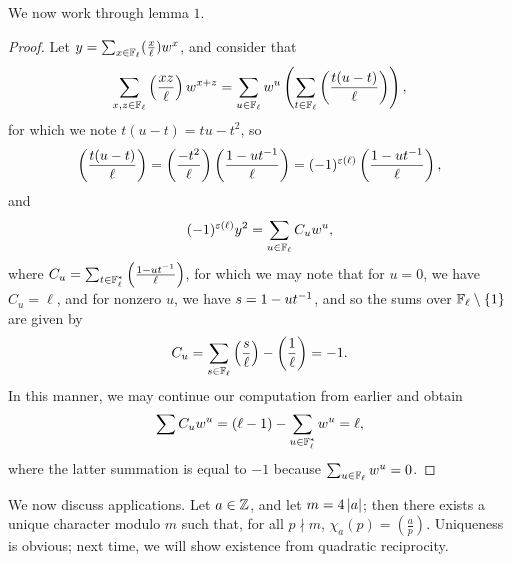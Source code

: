 We now work through lemma $1$.
\begin{proof}
    Let $y = \sum_{x \in \mathbb F_\ell} (\frac{x}{\ell}) w^x$, and consider that
    \[ \sum_{x, z \in \mathbb F_\ell} \left(\frac{xz}{\ell}\right) w^{x + z} = \sum_{u \in \mathbb F_\ell} w^u \left(\sum_{t \in \mathbb F_\ell} \left(\frac{t(u-t)}{\ell}\right)\right), \]
    for which we note $t(u - t) = tu - t^2$, so
    \[ \left(\frac{t(u-t)}{\ell}\right) = \left(\frac{-t^2}{\ell}\right)\left(\frac{1-ut^{-1}}{\ell}\right) = (-1)^{\varepsilon(\ell)} \left(\frac{1-ut^{-1}}{\ell}\right), \]
    and
    \[ (-1)^{\varepsilon(\ell)} y^2 = \sum_{u \in \mathbb F_\ell} C_u w^u, \]
    where $C_u = \sum_{t \in \mathbb F_\ell^\ast} \left(\frac{1 - ut^{-1}}{\ell}\right)$, for which we may note that for $u = 0$, we have $C_u = \ell$, and for nonzero $u$, we have $s = 1 - ut^{-1}$, and so the sums over $\mathbb F_\ell \setminus \{1\}$ are given by
    \[ C_u = \sum_{s \in \mathbb F_\ell} \left(\frac{s}{\ell}\right) - \left(\frac{1}{\ell}\right) = -1. \]
    In this manner, we may continue our computation from earlier and obtain
    \[ \sum C_u w^u = (\ell - 1) - \sum_{u \in \mathbb F_\ell^\ast} w^u = \ell, \]
    where the latter summation is equal to $-1$ because $\sum_{u \in \mathbb F_\ell} w^u = 0$.
\end{proof}
\noindent We now discuss applications. Let $a \in \mathbb Z$, and let $m = 4 \left\lvert a \right\rvert$; then there exists a unique character modulo $m$ such that, for all $p \nmid m$, $\chi_a(p) = \left(\frac{a}{p}\right)$. Uniqueness is obvious; next time, we will show existence from quadratic reciprocity.